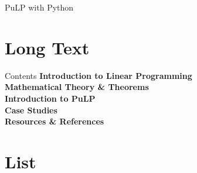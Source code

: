 \documentclass{purdue-slide}
\subtitle{Solving MILP problems using the GLPK solver.}
\author{Stan Ioan-Victor, Ioan-Gabriel Spatariu, Ana Sabina Tatar, Mihnea-Gabriel Vasile, Tepfenhart Bertold }
\begin{document}
\begin{titleframe}{PuLP with Python}
	\maketitle
\end{titleframe}

\section{Long Text}

\begin{frame}{Contents}
	\textbf{Introduction to Linear Programming} \\
	\textbf{Mathematical Theory \& Theorems} \\
	\textbf{Introduction to PuLP} \\
	\textbf{Case Studies} \\
	\textbf{Resources \& References} \\
\end{frame}

\section{List}
\end{document}
